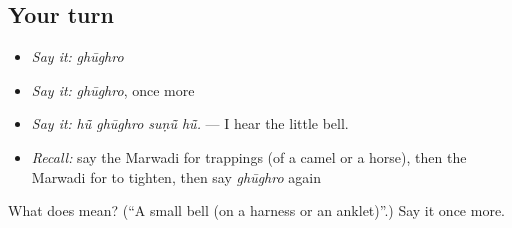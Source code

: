 \subsection*{Your turn}
\begin{itemize}
\raggedright
  \item \emph{Say it:} \emph{ghūghro}
  \item \emph{Say it:} \emph{ghūghro}, once more
  \item \emph{Say it:} \emph{hū̃ ghūghro suṇū̃ hū̃.} — I hear the little bell.
  \item \emph{Recall:} say the Marwadi for trappings (of a camel or a horse), then the Marwadi for to tighten, then say \emph{ghūghro} again
\end{itemize}

\begin{tcolorbox}[breakable,colback=teal!4,colframe=teal!35!black,title={Before you move on}]
What does  mean? (\textquotedblleft{}A small bell (on a harness or an anklet)\textquotedblright{}.) Say it once more.
\end{tcolorbox}
